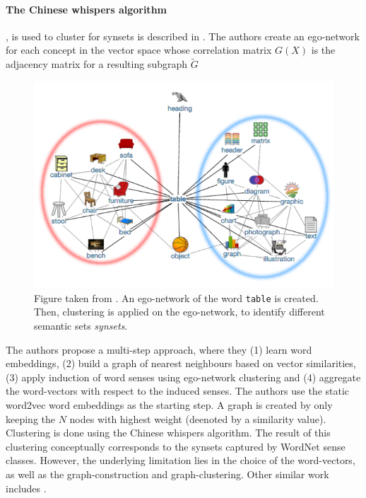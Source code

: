 \documentclass[a4paper,12pt,twoside,openright]{report}
\begin{document}
\paragraph{The Chinese whispers algorithm} , is used to cluster for synsets is described in \cite{pelevina16}.
The authors create an ego-network for each concept in the vector space whose correlation matrix $G(X)$ is the adjacency matrix for a resulting subgraph $\tilde{G}$

\begin{figure}[h]
	\center
  \includegraphics[width=0.6\linewidth]{./assets/relatedwork/ego_network.png}
  \caption{Figure taken from \cite{pelevina16}. An ego-network of the word \texttt{table} is created. Then, clustering is applied on the ego-network, to identify different semantic sets \textit{synsets}.}
  \label{fig:ego_network}
\end{figure}

The authors propose a multi-step approach, where they (1) learn word embeddings, (2) build a graph of nearest neighbours based on vector similarities, (3) apply induction of word senses using ego-network clustering and (4) aggregate the word-vectors with respect to the induced senses.
The authors use the static word2vec word embeddings as the starting step.
A graph is created by only keeping the $N$ nodes with highest weight (deenoted by a similarity value).
Clustering is done using the Chinese whispers algorithm.
The result of this clustering conceptually corresponds to the synsets captured by WordNet sense classes.
However, the underlying limitation lies in the choice of the word-vectors, as well as the graph-construction and graph-clustering.
Other similar work includes \cite{arefyev19}.
\end{document}
